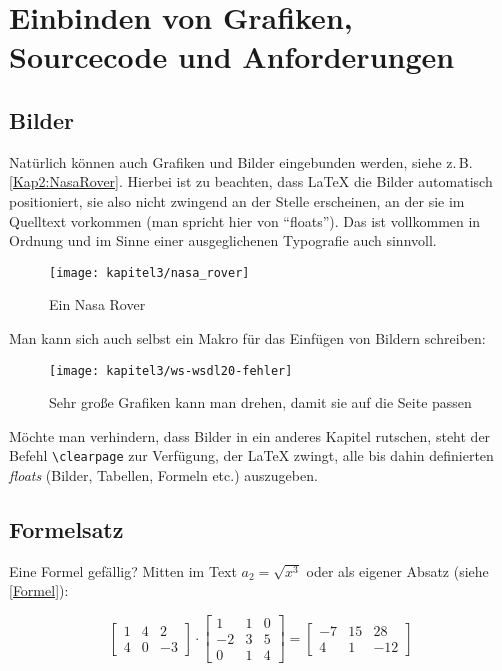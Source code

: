 \chapter{Einbinden von Grafiken, Sourcecode und Anforderungen}
\label{Kap3}

\section{Bilder}

Natürlich können auch Grafiken und Bilder eingebunden werden, siehe z.\,B. \autoref{Kap2:NasaRover}. Hierbei ist zu beachten, dass \LaTeX{} die Bilder automatisch positioniert, sie also nicht zwingend an der Stelle erscheinen, an der sie im Quelltext vorkommen (man spricht hier von \enquote{floats}). Das ist vollkommen in Ordnung und im Sinne einer ausgeglichenen Typografie auch sinnvoll.

\begin{figure}[ht]
  \centering
  \texttt{[image: kapitel3/nasa\_rover]}
  \caption{Ein Nasa Rover}
  \label{Kap2:NasaRover}
\end{figure}

Man kann sich auch selbst ein Makro für das Einfügen von Bildern schreiben:


\begin{sidewaysfigure}
 \texttt{[image: kapitel3/ws-wsdl20-fehler]}
  \caption{Sehr gro\ss{}e Grafiken kann man drehen, damit sie auf die Seite passen}
  \label{Kap2:wsdl-fehler}
\end{sidewaysfigure}

Möchte man verhindern, dass Bilder in ein anderes Kapitel rutschen, steht der Befehl \verb+\clearpage+ zur Verfügung, der \LaTeX{} zwingt, alle bis dahin definierten \textit{floats} (Bilder, Tabellen, Formeln etc.) auszugeben.

\clearpage %


\section{Formelsatz}

Eine Formel gefällig? Mitten im Text $a_2 = \sqrt{x^3}$ oder als eigener Absatz (siehe \autoref{Formel}):

\begin{equation}
\begin{bmatrix}
   1 &  4 &  2 \\
   4 &  0 & -3
\end{bmatrix}
        \cdot
\begin{bmatrix}
   1 &  1 &  0 \\
  -2 &  3 &  5 \\
   0 &  1 &  4
\end{bmatrix}
       {=}
\begin{bmatrix}
  -7 &  15 &  28 \\
   4 &   1 & -12
\end{bmatrix}
\label{Formel}
\end{equation}

